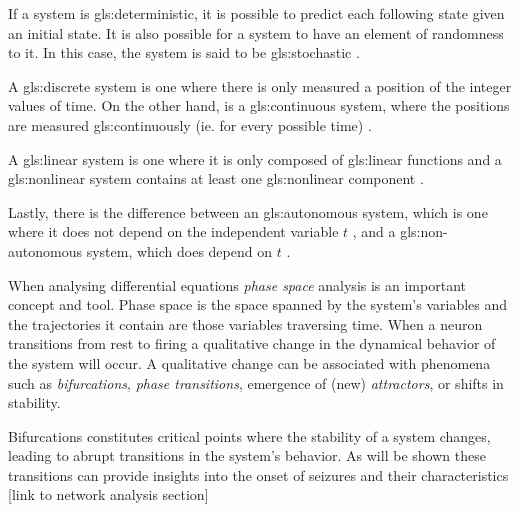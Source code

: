 \documentclass[../../Orator.tex]{subfiles}
\begin{document}
If a system is \gls{gls:deterministic}, it is possible to predict each following state given an initial state. It is also possible for a system to have an element of randomness to it. In this case, the system is said to be \gls{gls:stochastic} \cite{}. 

A \gls{gls:discrete} system is one where there is only measured a position of the integer values of time. On the other hand, is a \gls{gls:continuous} system, where the positions are measured \gls{gls:continuous}ly (ie. for every possible time) \cite{}.

A \gls{gls:linear} system is one where it is only composed of \gls{gls:linear} functions and a \gls{gls:nonlinear} system contains at least one \gls{gls:nonlinear} component \cite{}.

Lastly, there is the difference between an \gls{gls:autonomous} system, which is one where it does not depend on the independent variable \(t\) \cite{}, and a \gls{gls:non-autonomous} system, which does depend on \(t\) \cite{}.


\begin{comment}
    \begin{split}\left[\begin{array}{ccll}
    {\displaystyle \frac{du}{dt}} &=& u\left(1-u^{2}\right)-w+I \equiv F(u,w)\\[.2cm]
    {\displaystyle \frac{dw}{dt}} &=& \varepsilon \left(u -0.5w+1\right) \equiv \varepsilon G(u,w)\, ,\\
    \end{array}\right.\end{split}
    [ref:https://neuronaldynamics-exercises.readthedocs.io/en/latest/exercises/brunel-network.html]
\end{comment}

When analysing differential equations \textit{phase space} analysis is an important concept and tool. Phase space is the space spanned by the system's variables and the trajectories it contain are those variables traversing time. When a neuron transitions from rest to firing a qualitative change in the dynamical behavior of the system will occur. A qualitative change can be associated with phenomena such as \textit{bifurcations}, \textit{phase transitions}, emergence of (new) \textit{attractors}, or shifts in stability. 

Bifurcations constitutes critical points where the stability of a system changes, leading to abrupt transitions in the system's behavior. As will be shown these transitions can provide insights into the onset of seizures and their characteristics [link to network analysis section]
\end{document}
